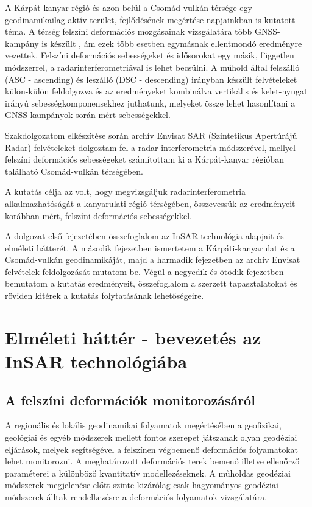 \documentclass[12pt]{report}
\numberwithin{equation}{section}
\numberwithin{table}{section}
\numberwithin{figure}{section}
\begin{document}
A Kárpát-kanyar régió és azon belül a Csomád-vulkán térsége egy geodinamikailag aktív terület, fejlődésének megértése napjainkban is kutatott téma.  A térség felszíni deformációs mozgásainak vizsgálatára több GNSS-kampány is készült \cite{Hoeven2005, Schmitt2007}, ám ezek több esetben egymásnak ellentmondó eredményre vezettek. Felszíni deformációs sebességeket és idősorokat egy másik, független módszerrel, a radarinterferometriával is lehet becsülni. A műhold által felszálló (ASC - ascending) és leszálló (DSC - descending) irányban készült felvételeket külön-külön feldolgozva és az eredményeket kombinálva vertikális és kelet-nyugat irányú sebességkomponensekhez juthatunk, melyeket össze lehet hasonlítani a GNSS kampányok során mért sebességekkel.

Szakdolgozatom elkészítése során archív Envisat SAR (Szintetikus Apertúrájú Radar) felvételeket dolgoztam fel a radar interferometria módszerével, mellyel felszíni deformációs sebességeket számítottam ki a Kárpát-kanyar régióban található Csomád-vulkán térségében.

A kutatás célja az volt, hogy megvizsgáljuk radarinterferometria alkalmazhatóságát a kanyarulati régió térségében, összevessük az eredményeit korábban mért, felszíni deformációs sebességekkel.

A dolgozat első fejezetében összefoglalom az InSAR technológia alapjait és elméleti hátterét. A második fejezetben ismertetem a Kárpáti-kanyarulat és a Csomád-vulkán geodinamikáját, majd a harmadik fejezetben az archív Envisat felvételek feldolgozását mutatom be. Végül a negyedik és ötödik fejezetben bemutatom a kutatás eredményeit, összefoglalom a szerzett tapasztalatokat és röviden kitérek a kutatás folytatásának lehetőségeire.

\chapter{Elméleti háttér - bevezetés az InSAR technológiába}

\section{A felszíni deformációk monitorozásáról}

A regionális és lokális geodinamikai folyamatok megértésében a geofizikai, geológiai és egyéb módszerek mellett fontos szerepet játszanak olyan geodéziai eljárások, melyek segítségével a felszínen végbemenő deformációs folyamatokat lehet monitorozni. A meghatározott deformációs terek bemenő illetve ellenőrző paraméterei a különböző kvantitatív modellezéseknek. A műholdas geodéziai módszerek megjelenése előtt szinte kizárólag csak hagyományos geodéziai módszerek álltak rendelkezésre a deformációs folyamatok vizsgálatára.
\end{document}
